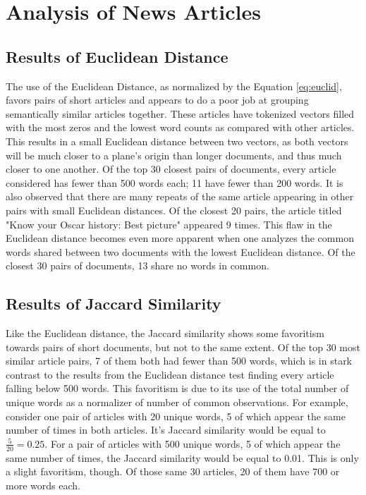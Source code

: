 \documentclass[11pt]{article}
\begin{document}
\section{Analysis of News Articles}

\subsection{Results of Euclidean Distance}
The use of the Euclidean Distance, as normalized by the Equation \ref{eq:euclid}, favors pairs of short articles and appears to do a poor job at grouping semantically similar articles together.
These articles have tokenized vectors filled with the most zeros and the lowest word counts as compared with other articles.
This results in a small Euclidean distance between two vectors, as both vectors will be much closer to a plane's origin than longer documents, and thus much closer to one another.
Of the top 30 closest pairs of documents, every article considered has fewer than 500 words each; 11 have fewer than 200 words.
It is also observed that there are many repeats of the same article appearing in other pairs with small Euclidean distances.
Of the closest 20 pairs, the article titled "Know your Oscar history: Best picture" appeared 9 times.
This flaw in the Euclidean distance becomes even more apparent when one analyzes the common words shared between two documents with the lowest Euclidean distance.
Of the closest 30 pairs of documents, 13 share no words in common.

\subsection{Results of Jaccard Similarity}

Like the Euclidean distance, the Jaccard similarity shows some favoritism towards pairs of short documents, but not to the same extent.
Of the top 30 most similar article pairs, 7 of them both had fewer than 500 words, which is in stark contrast to the results from the Euclidean distance test finding every article falling below 500 words.
This favoritism is due to its use of the total number of unique words as a normalizer of number of common observations.
For example, consider one pair of articles with 20 unique words, 5 of which appear the same number of times in both articles.
It's Jaccard similarity would be equal to $\frac{5}{20} = 0.25$.
For a pair of articles with 500 unique words, 5 of which appear the same number of times, the Jaccard similarity would be equal to 0.01.
This is only a slight favoritism, though.
Of those same 30 articles, 20 of them have 700 or more words each.
\end{document}
